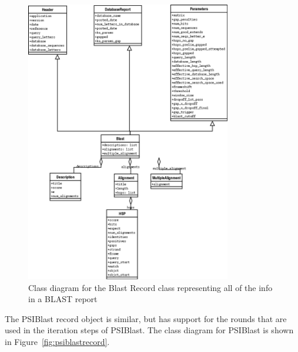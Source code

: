 \documentclass{report}
\begin{document}
\begin{latexonly}
\begin{figure}[htbp]
\centering
\includegraphics[width=0.8\textwidth]{images/BlastRecord.png}
\caption{Class diagram for the Blast Record class representing all of the info in a BLAST report}
\label{fig:blastrecord}
\end{figure}
\end{latexonly}

The PSIBlast record object is similar, but has support for the rounds that are used in the iteration steps of PSIBlast. The class diagram for PSIBlast is shown in Figure~\ref{fig:psiblastrecord}.

\begin{htmlonly}
\label{fig:psiblastrecord}
\end{htmlonly}
\end{document}
